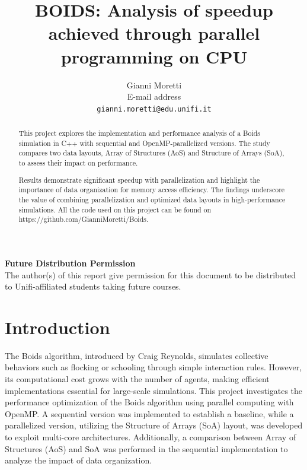 \documentclass[10pt,twocolumn,letterpaper]{article}
\begin{document}
\title{BOIDS: Analysis of speedup achieved through parallel programming on CPU}

\author{Gianni Moretti\\
E-mail address\\
{\tt\small gianni.moretti@edu.unifi.it}
}

\maketitle
\thispagestyle{empty}

\begin{abstract}
This project explores the implementation and performance analysis of a Boids simulation in C++ with sequential and OpenMP-parallelized versions. The study compares two data layouts, Array of Structures (AoS) and Structure of Arrays (SoA), to assess their impact on performance.

Results demonstrate significant speedup with parallelization and highlight the importance of data organization for memory access efficiency. The findings underscore the value of combining parallelization and optimized data layouts in high-performance simulations. All the code used on this project can be found on https://github.com/GianniMoretti/Boids.
\end{abstract}

\noindent\large\textbf{Future Distribution Permission}\\
\indent The author(s) of this report give permission for this document to be distributed to Unifi-affiliated students taking future courses.

\section{Introduction}
The Boids algorithm, introduced by Craig Reynolds, simulates collective behaviors such as flocking or schooling through simple interaction rules. However, its computational cost grows with the number of agents, making efficient implementations essential for large-scale simulations.
This project investigates the performance optimization of the Boids algorithm using parallel computing with OpenMP. A sequential version was implemented to establish a baseline, while a parallelized version, utilizing the Structure of Arrays (SoA) layout, was developed to exploit multi-core architectures. Additionally, a comparison between Array of Structures (AoS) and SoA was performed in the sequential implementation to analyze the impact of data organization.
\end{document}
